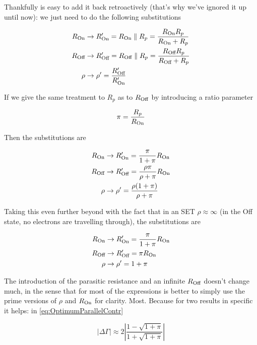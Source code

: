 \documentclass[../main.tex]{subfiles}
\begin{document}
Thankfully is easy to add it back retroactively (that's why we've ignored it
up until now): we just need to do the following substitutions

\begin{align*}
    R_{\text{On}}& \rightarrow R^{\prime}_{\text{On}}
    = R_{\text{On}} \parallel R_{p}
    = \frac{R_{\text{On}} R_{p}}{R_{\text{On}} + R_{p}}\\
    R_{\text{Off}}& \rightarrow R^{\prime}_{\text{Off}}
    = R_{\text{Off}} \parallel R_{p}
    = \frac{R_{\text{Off}} R_{p}}{R_{\text{Off}} + R_{p}}\\
    \rho& \rightarrow \rho^{\prime} 
    = \frac{R_{\text{Off}}^{\prime}}{R_{\text{On}}^{\prime}}
\end{align*}

If we give the same treatment to \(R_{p}\) as to \(R_{\text{Off}}\) by
introducing a ratio parameter

\begin{equation}
\label{eq:PiDef}
    \pi = \frac{R_{p}}{R_{\text{On}}}
\end{equation}

Then the substitutions are

\begin{align*}
    R_{\text{On}}& \rightarrow R^{\prime}_{\text{On}}
    = \frac{\pi}{1 + \pi} R_{\text{On}}\\
    R_{\text{Off}}& \rightarrow R^{\prime}_{\text{Off}}
    = \frac{\rho\pi}{\rho + \pi}R_{\text{On}}\\
    \rho& \rightarrow \rho^{\prime} 
    = \frac{\rho(1 + \pi)}{\rho + \pi}
\end{align*}

Taking this even further beyond with the fact that in an SET
\(\rho \approx \infty\) (in the Off state, no electrons are travelling through),
the substitutions are

\begin{align*}
    R_{\text{On}}& \rightarrow R^{\prime}_{\text{On}}
    = \frac{\pi}{1 + \pi} R_{\text{On}}\\
    R_{\text{Off}}& \rightarrow R^{\prime}_{\text{Off}}
    = \pi R_{\text{On}}\\
    \rho& \rightarrow \rho^{\prime} 
    = 1 + \pi
\end{align*}

The introduction of the parasitic resistance and an infinite \(R_{\text{Off}}\)
doesn't change much, in the sense that for most of the expressions is better
to simply use the prime versions of \(\rho\) and \(R_{\text{On}}\) for clarity.
Most. Because for two results in specific it helps: in
\ref{eq:OptimumParallelContr}

\begin{equation}
\label{eq:OptimumParallelContrOfPi}
    |\Delta\Gamma| \approx
                   2\left|
                   \frac{1 - \sqrt{1 + \pi}}{1 + \sqrt{1 + \pi}}
                   \right|
\end{equation}
\end{document}
